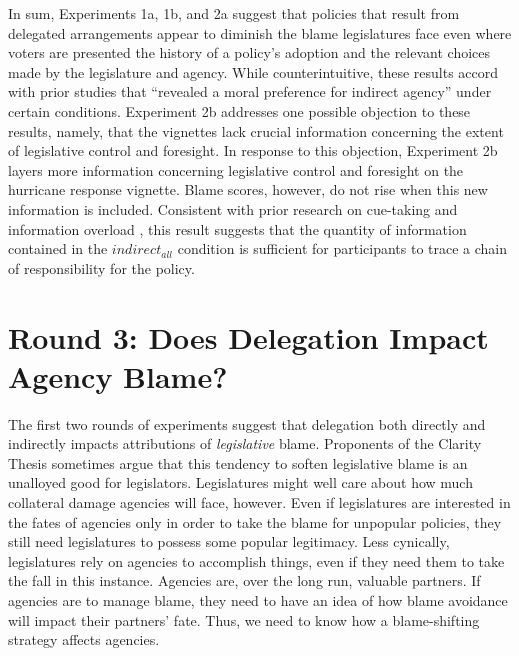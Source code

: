 \documentclass{article}
\begin{document}
In sum, Experiments 1a, 1b, and 2a suggest that policies that result from delegated arrangements appear to diminish the blame legislatures face even where voters are presented the history of a policy's adoption and the relevant choices made by the legislature and agency. While counterintuitive, these results accord with prior studies that ``revealed a moral preference for indirect agency'' under certain conditions.\citep[p. 7]{Paharia2009} Experiment 2b addresses one possible objection to these results, namely, that the vignettes lack crucial information concerning the extent of legislative control and foresight. In response to this objection, Experiment 2b layers more information concerning legislative control and foresight on the hurricane response vignette. Blame scores, however, do not rise when this new information is included. Consistent with prior research on cue-taking and information overload \citep{Lupia1994b}, this result suggests that the quantity of information contained in the $indirect_{all}$ condition is sufficient for participants to trace a chain of responsibility for the policy.\citep{Arnold1990}

\section{Round 3: Does Delegation Impact Agency Blame?}

The first two rounds of experiments suggest that delegation both directly and indirectly impacts attributions of \emph{legislative} blame. Proponents of the Clarity Thesis sometimes argue that this tendency to soften legislative blame is an unalloyed good for legislators. Legislatures might well care about how much collateral damage agencies will face, however. Even if legislatures are interested in the fates of agencies only in order to take the blame for unpopular policies, they still need legislatures to possess some popular legitimacy. Less cynically, legislatures rely on agencies to accomplish things, even if they need them to take the fall in this instance. Agencies are, over the long run, valuable partners. If agencies are to manage blame, they need to have an idea of how blame avoidance will impact their partners' fate. Thus, we need to know how a blame-shifting strategy affects agencies.
\end{document}
